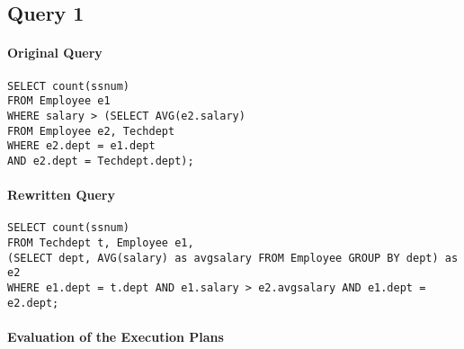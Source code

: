 \documentclass[11pt]{scrartcl}
\begin{document}
\subsection*{Query 1}

\paragraph{Original Query}

{\small
\begin{verbatim}
SELECT count(ssnum)
FROM Employee e1
WHERE salary > (SELECT AVG(e2.salary)
FROM Employee e2, Techdept
WHERE e2.dept = e1.dept
AND e2.dept = Techdept.dept);
\end{verbatim}
}

\paragraph{Rewritten Query}

{\small
\begin{verbatim}
SELECT count(ssnum)
FROM Techdept t, Employee e1, 
(SELECT dept, AVG(salary) as avgsalary FROM Employee GROUP BY dept) as e2
WHERE e1.dept = t.dept AND e1.salary > e2.avgsalary AND e1.dept = e2.dept;
\end{verbatim}
}

\newpage
\paragraph{Evaluation of the Execution Plans}
\end{document}
